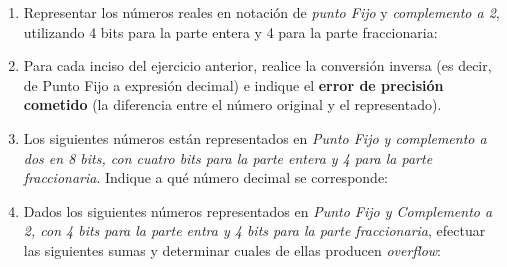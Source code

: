 \documentclass[12pt]{article}
\begin{document}
\begin{enumerate}[resume]

    \item Representar los números reales en notación de \emph{punto Fijo} y
        \emph{complemento a 2}, utilizando 4 bits para la parte entera y 4
        para la parte fraccionaria:


    \item Para cada inciso del ejercicio anterior, realice la conversión
        inversa (es decir, de Punto Fijo a expresión decimal) e indique el
        \textbf{error de precisión cometido} (la diferencia entre el número
        original y el representado).

    \item Los siguientes números están representados en \emph{Punto Fijo
        y complemento a dos en 8 bits, con cuatro bits para la parte entera y
        4 para la parte fraccionaria}. Indique a qué número decimal se corresponde:


    \item Dados los siguientes números representados en \emph{Punto Fijo y
        Complemento a 2, con 4 bits para la parte entra y 4 bits para la parte
        fraccionaria}, efectuar las siguientes sumas y determinar cuales de ellas
        producen \emph{overflow}:


\end{enumerate}
\end{document}
